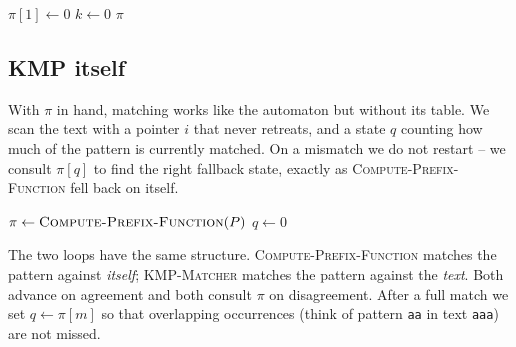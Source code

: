 \begin{algorithm}[H]
\caption{\textsc{Compute-Prefix-Function}}
$\pi[1] \leftarrow 0$\;
$k \leftarrow 0$ 
\Return $\pi$\;
\end{algorithm}

\subsection{KMP itself}

With $\pi$ in hand, matching works like the automaton but without its
table. We scan the text with a pointer $i$ that never retreats, and a state $q$
counting how much of the pattern is currently matched. On a mismatch we do not
restart -- we consult $\pi[q]$ to find the right fallback state, exactly as
\textsc{Compute-Prefix-Function} fell back on itself.

\begin{algorithm}[H]
\caption{\textsc{KMP-Matcher}}
$\pi \leftarrow \textsc{Compute-Prefix-Function}(P)$\;
$q \leftarrow 0$ 
\end{algorithm}

The two loops have the same structure. \textsc{Compute-Prefix-Function} matches the pattern
against \emph{itself}; \textsc{KMP-Matcher} matches the pattern against the
\emph{text}. Both advance on agreement and both consult $\pi$ on disagreement.
After a full match we set $q \leftarrow \pi[m]$ so that overlapping occurrences
(think of pattern \texttt{aa} in text \texttt{aaa}) are not missed.

